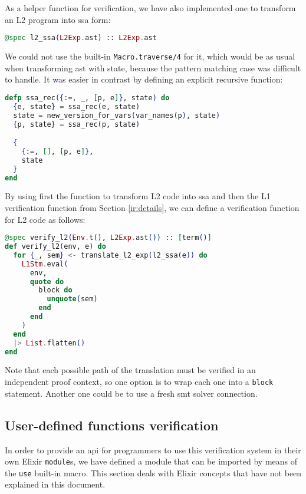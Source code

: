 As a helper function for verification, we have also implemented one to transform
an L2 program into \gls{ssa} form:

\begin{lstlisting}[language=elixir,numbers=none,frame=none]
@spec l2_ssa(L2Exp.ast) :: L2Exp.ast
\end{lstlisting}

We could not use the built-in \verb|Macro.traverse/4| for it, which would be as
usual when transforming \gls{ast} with state, because the pattern matching case
was difficult to handle. It was easier in contrast by defining an explicit
recursive function:

\begin{lstlisting}[language=elixir,numbers=none,frame=none]
defp ssa_rec({:=, _, [p, e]}, state) do
  {e, state} = ssa_rec(e, state)
  state = new_version_for_vars(var_names(p), state)
  {p, state} = ssa_rec(p, state)

  {
    {:=, [], [p, e]},
    state
  }
end
\end{lstlisting}

By using first the function to transform L2 code into \gls{ssa} and then the L1
verification function from Section \ref{ir:details}, we can define a
verification function for L2 code as follows:

\begin{lstlisting}[language=elixir,numbers=none,frame=none]
@spec verify_l2(Env.t(), L2Exp.ast()) :: [term()]
def verify_l2(env, e) do
  for {_, sem} <- translate_l2_exp(l2_ssa(e)) do
    L1Stm.eval(
      env,
      quote do
        block do
          unquote(sem)
        end
      end
    )
  end
  |> List.flatten()
end
\end{lstlisting}

Note that each possible path of the translation must be verified in an
independent proof context, so one option is to wrap each one into a \verb|block|
statement. Another one could be to use a fresh \acrshort{smt} solver connection.

\subsection{User-defined functions verification}

In order to provide an \gls{api} for programmers to use this verification system
in their own Elixir \verb|module|s, we have defined a module that can be
imported by means of the \verb|use| built-in macro. This section deals with
Elixir concepts that have not been explained in this document.

